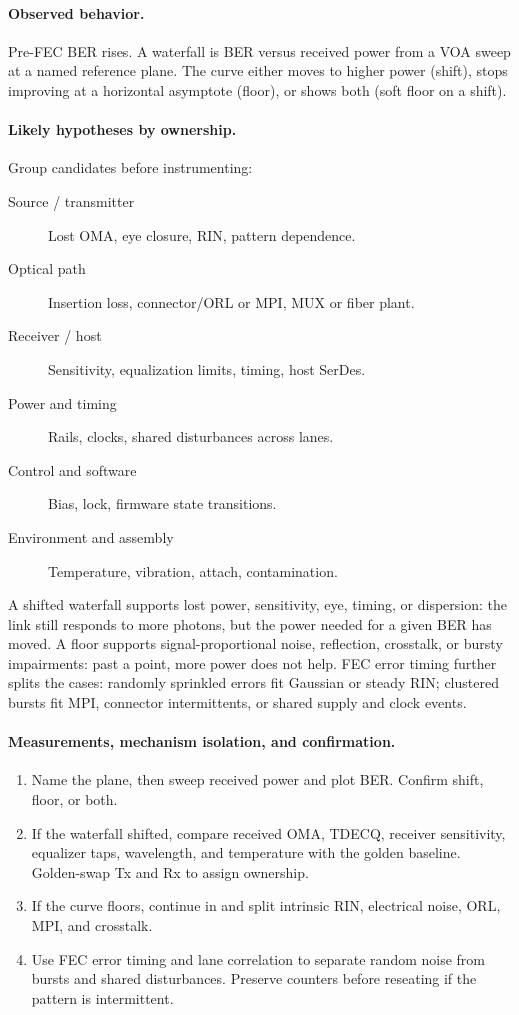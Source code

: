 \paragraph{Observed behavior.}
Pre-FEC BER rises. A waterfall is BER versus received power from a VOA sweep at
a named reference plane. The curve either moves to higher power (shift), stops
improving at a horizontal asymptote (floor), or shows both (soft floor on a
shift).

\paragraph{Likely hypotheses by ownership.}
Group candidates before instrumenting:
\begin{description}
\item[Source / transmitter] Lost OMA, eye closure, RIN, pattern dependence.
\item[Optical path] Insertion loss, connector/ORL or MPI, MUX or fiber plant.
\item[Receiver / host] Sensitivity, equalization limits, timing, host SerDes.
\item[Power and timing] Rails, clocks, shared disturbances across lanes.
\item[Control and software] Bias, lock, firmware state transitions.
\item[Environment and assembly] Temperature, vibration, attach, contamination.
\end{description}
A shifted waterfall supports lost power, sensitivity, eye, timing, or dispersion:
the link still responds to more photons, but the power needed for a given BER has
moved. A floor supports signal-proportional noise, reflection, crosstalk, or
bursty impairments: past a point, more power does not help. FEC error timing
further splits the cases: randomly sprinkled errors fit Gaussian or steady RIN;
clustered bursts fit MPI, connector intermittents, or shared supply and clock
events.

\paragraph{Measurements, mechanism isolation, and confirmation.}
\begin{enumerate}
\item Name the plane, then sweep received power and plot BER. Confirm shift,
      floor, or both.
\item If the waterfall shifted, compare received OMA, TDECQ, receiver
      sensitivity, equalizer taps, wavelength, and temperature with the golden
      baseline. Golden-swap Tx and Rx to assign ownership.
\item If the curve floors, continue in  and split
      intrinsic RIN, electrical noise, ORL, MPI, and crosstalk.
\item Use FEC error timing and lane correlation to separate random noise from
      bursts and shared disturbances. Preserve counters before reseating if the
      pattern is intermittent.
\end{enumerate}


